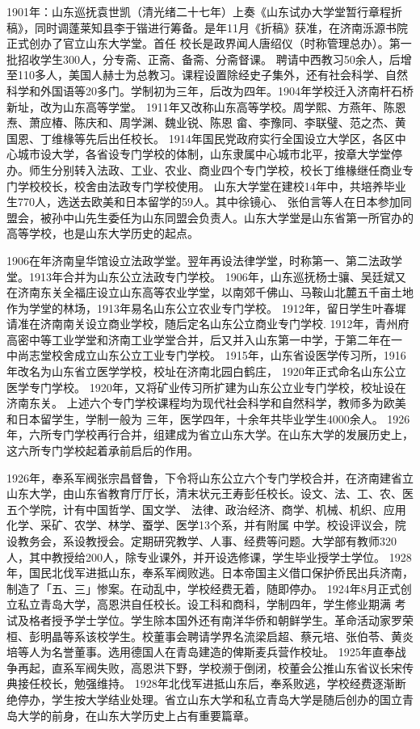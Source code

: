 \documentclass{sduthesis}
\begin{document}
1901年：山东巡抚袁世凯（清光绪二十七年）上奏《山东试办大学堂暂行章程折稿》，同时调蓬莱知县李于锴进行筹备。是年11月《折稿》获准，在济南泺源书院正式创办了官立山东大学堂。首任 校长是政界闻人唐绍仪（时称管理总办）。第一批招收学生300人，分专斋、正斋、备斋、分斋督课。 聘请中西教习50余人，后增至110多人，美国人赫士为总教习。课程设置除经史子集外，还有社会科学、自然科学和外国语等20多门。学制初为三年，后改为四年。1904年学校迁入济南杆石桥新址，改为山东高等学堂。 1911年又改称山东高等学校。周学熙、方燕年、陈恩焘、萧应椿、陈庆和、周学渊、魏业锐、陈恩 畲、李豫同、李联璧、范之杰、黄国恩、丁维椽等先后出任校长。 1914年国民党政府实行全国设立大学区，各区中心城市设大学，各省设专门学校的体制，山东隶属中心城市北平，按章大学堂停办。师生分别转入法政、工业、农业、商业四个专门学校，校长丁维椽继任商业专门学校校长，校舍由法政专门学校使用。 山东大学堂在建校14年中，共培养毕业生770人，选送去欧美和日本留学的59人。其中徐镜心、 张伯言等人在日本参加同盟会，被孙中山先生委任为山东同盟会负责人。山东大学堂是山东省第一所官办的高等学校，也是山东大学历史的起点。

1906在年济南皇华馆设立法政学堂。翌年再设法律学堂，时称第一、第二法政学堂。1913年合并为山东公立法政专门学校。 1906年，山东巡抚杨士骧、吴廷斌又在济南东关全福庄设立山东高等农业学堂，以南郊千佛山、马鞍山北麓五千亩土地作为学堂的林场，1913年易名山东公立农业专门学校。 1912年，留日学生叶春墀请准在济南南关设立商业学校，随后定名山东公立商业专门学校. 1912年，青州府高密中等工业学堂和济南工业学堂合并，后又并入山东第一中学，于第二年在一 中尚志堂校舍成立山东公立工业专门学校。 1915年，山东省设医学传习所，1916年改名为山东省立医学学校，校址在济南北园白鹤庄， 1920年正式命名山东公立医学专门学校。 1920年，又将矿业传习所扩建为山东公立业专门学校，校址设在济南东关。 上述六个专门学校课程均为现代社会科学和自然科学，教师多为欧美和日本留学生，学制一般为 三年，医学四年，十余年共毕业学生4000余人。 1926年，六所专门学校再行合并，组建成为省立山东大学。在山东大学的发展历史上，这六所专门学校起着承前启后的作用。

1926年，奉系军阀张宗昌督鲁，下令将山东公立六个专门学校合并，在济南建省立山东大学，由山东省教育厅厅长，清末状元王寿彭任校长。设文、法、工、农、医五个学院，计有中国哲学、国文学、 法律、政治经济、商学、机械、机织、应用化学、采矿、农学、林学、蚕学、医学13个系，并有附属 中学。校设评议会，院设教务会，系设教授会。定期研究教学、人事、经费等问题。大学部有教师320 人，其中教授给200人，除专业课外，并开设选修课，学生毕业授学士学位。 1928年，国民北伐军进抵山东，奉系军阀败逃。日本帝国主义借口保护侨民出兵济南，制造了「五、三」惨案。在动乱中，学校经费无着，随即停办。 1924年8月正式创立私立青岛大学，高恩洪自任校长。设工科和商科，学制四年，学生修业期满 考试及格者授予学士学位。学生除本国外还有南洋华侨和朝鲜学生。革命活动家罗荣桓、彭明晶等系该校学生。校董事会聘请学界名流梁启超、蔡元培、张伯苓、黄炎培等人为名誉董事。选用德国人在青岛建造的俾斯麦兵营作校址。 1925年直奉战争再起，直系军阀失败，高恩洪下野，学校濒于倒闭，校董会公推山东省议长宋传典接任校长，勉强维持。 1928年北伐军进抵山东后，奉系败逃，学校经费逐渐断绝停办，学生按大学结业处理。省立山东大学和私立青岛大学是随后创办的国立青岛大学的前身，在山东大学历史上占有重要篇章。
\end{document}
